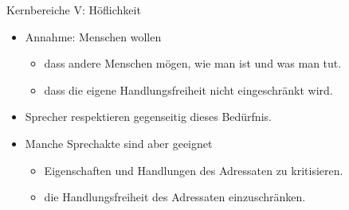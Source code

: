 \begin{frame}{Kernbereiche V: Höflichkeit}


\begin{exe}
\end{exe}


 

  \begin{itemize}[<+->]
  \item Annahme: Menschen wollen
    \begin{itemize}
    \item dass andere Menschen mögen, wie man ist und was man tut.
    \item dass die eigene Handlungsfreiheit nicht eingeschränkt wird.
    \end{itemize}
 \item Sprecher respektieren gegenseitig dieses Bedürfnis.
  \item Manche Sprechakte sind aber geeignet 
    \begin{itemize}
    \item Eigenschaften und Handlungen des Adressaten zu kritisieren.
    \item die Handlungsfreiheit des Adressaten einzuschränken.
    \end{itemize}
 \end{itemize}
\end{frame}


